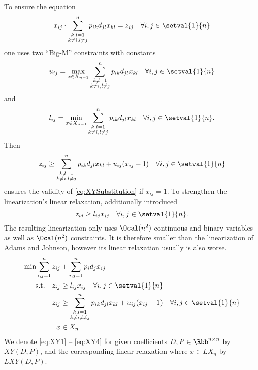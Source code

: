 To ensure the equation 
\begin{equation}
	\label{eq:XYSubstitution}
	x_{ij} \cdot \sum_{\substack{k,l = 1\\k\neq i, l\neq j}}^n p_{ik}d_{jl}x_{kl} = z_{ij}\quad\forall i,j\in\setval{1}{n}
\end{equation}
one uses two \enquote{Big-M} constraints with constants 
\begin{equation}
	u_{ij} = \max_{x\in X_{n-1}}\sum_{\substack{k,l = 1\\k \neq i, l\neq j}}^n p_{ik}d_{jl}x_{kl}\quad\forall i,j\in\setval{1}{n}
\label{eq:DefinitionU}
\end{equation}
and
\begin{equation}
	l_{ij} = \min_{x\in X_{n-1}}\sum_{\substack{k,l = 1\\k\neq i, l\neq j}}^n p_{ik}d_{jl}x_{kl}\quad\forall i,j\in\setval{1}{n}.
\label{eq:DefinitionL}
\end{equation}
Then 
\begin{equation*}
	z_{ij}\geq \sum_{\substack{k,l=1\\k\neq i, l\neq j}}^np_{ik}d_{jl}x_{kl}+u_{ij}(x_{ij}-1)\quad\forall i,j\in\setval{1}{n}
\end{equation*}
ensures the validity of \eqref{eq:XYSubstitution} if $x_{ij} = 1$. To strengthen the linearization's linear relaxation, \cite{MR2238659} additionally introduced 
\begin{equation*}
	z_{ij}\geq l_{ij}x_{ij}\quad\forall i,j \in\setval{1}{n}.
\end{equation*}
The resulting linearization only uses $\Ocal(n^2)$ continuous and binary variables as well as $\Ocal(n^2)$ constraints. It is therefore smaller than the linearization of Adams and Johnson, however its linear relaxation usually is also worse.
\begin{align}
	\label{eq:XY1}
	\min\sum_{i,j = 1}^nz_{ij} &+\sum_{i,j=1}^np_id_jx_{ij}\\
	\label{eq:XYlInequality}
	\text{s.t.}\quad z_{ij}&\geq l_{ij}x_{ij}\quad\forall i,j \in\setval{1}{n}\\
	z_{ij}&\geq \sum_{\substack{k,l=1\\k\neq i, l\neq j}}^np_{ik}d_{jl}x_{kl}+u_{ij}(x_{ij}-1)\quad\forall i,j \in\setval{1}{n}\\
	\label{eq:XY4}
	x&\in X_n
\end{align}
We denote \eqref{eq:XY1} -- \eqref{eq:XY4} for given coefficients $D, P\in\Rbb^{n\times n}$ by $XY(D,P)$, and the corresponding linear relaxation where $x\in LX_n$ by $LXY(D,P)$.

